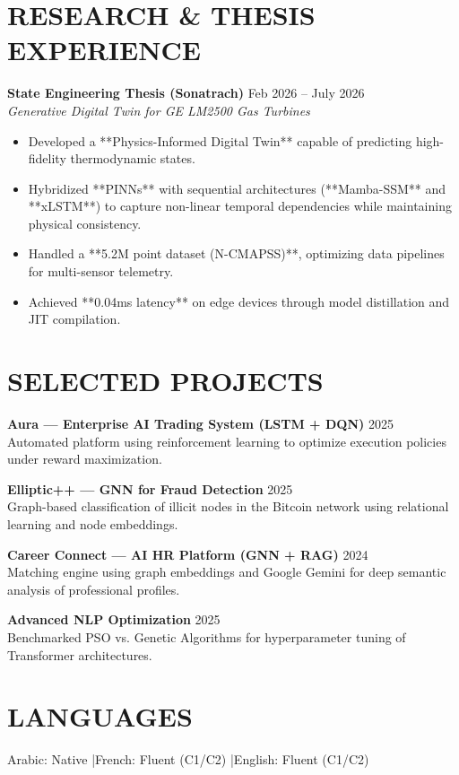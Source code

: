 \documentclass[a4paper,11pt]{article}
\begin{document}
\section{RESEARCH \& THESIS EXPERIENCE}
\textbf{State Engineering Thesis (Sonatrach)} \hfill Feb 2026 -- July 2026 \\
\textit{Generative Digital Twin for GE LM2500 Gas Turbines}
\begin{itemize}
    \item Developed a **Physics-Informed Digital Twin** capable of predicting high-fidelity thermodynamic states.
    \item Hybridized **PINNs** with sequential architectures (**Mamba-SSM** and **xLSTM**) to capture non-linear temporal dependencies while maintaining physical consistency.
    \item Handled a **5.2M point dataset (N-CMAPSS)**, optimizing data pipelines for multi-sensor telemetry.
    \item Achieved **0.04ms latency** on edge devices through model distillation and JIT compilation.
\end{itemize}

\section{SELECTED PROJECTS}
\textbf{Aura — Enterprise AI Trading System (LSTM + DQN)} \hfill 2025 \\
Automated platform using reinforcement learning to optimize execution policies under reward maximization.

\textbf{Elliptic++ — GNN for Fraud Detection} \hfill 2025 \\
Graph-based classification of illicit nodes in the Bitcoin network using relational learning and node embeddings.

\textbf{Career Connect — AI HR Platform (GNN + RAG)} \hfill 2024 \\
Matching engine using graph embeddings and Google Gemini for deep semantic analysis of professional profiles.

\textbf{Advanced NLP Optimization} \hfill 2025 \\
Benchmarked PSO vs. Genetic Algorithms for hyperparameter tuning of Transformer architectures.

\section{LANGUAGES}
Arabic: Native \quad|\quad French: Fluent (C1/C2) \quad|\quad English: Fluent (C1/C2)
\end{document}
